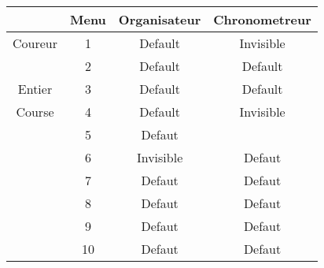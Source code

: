 \documentclass{article}
\begin{document}
	\begin{tabular}{c c|c|c|}
		\hline
			& \textbf{Menu} & \textbf{Organisateur} & \textbf{Chronometreur}\\	
		\hline
			Coureur & 1 & Default & Invisible \\ 
		\hline
			& 2 & Default &  Default\\ 
		\hline
			Entier & 3 & Default & Default \\ 
		\hline
			Course & 4 & Default &  Invisible\\ 
		\hline
			& 5 & Defaut &  \\ 
		\hline
			& 6 & Invisible&  Defaut\\ 
		\hline
			& 7 & Defaut &  Defaut\\ 
		\hline
			& 8 & Defaut &  Defaut\\ 
		\hline
			& 9 & Defaut &  Defaut\\ 
		\hline
			& 10 & Defaut &  Defaut\\ 
		\hline
	\end{tabular}
\end{document}
